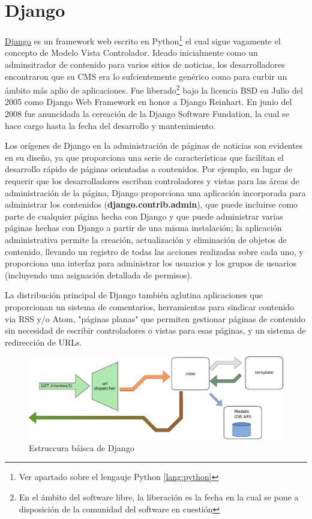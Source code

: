 \documentclass[a4paper]{report}
\begin{document}
\section{Django}
\href{http://www.djangoproject.com}{Django} es un framework web escrito en
Python\footnote{Ver apartado sobre el lengauje Python \ref{lang:python}}  el cual 
sigue vagamente el concepto de Modelo Vista
Controlador. Ideado inicialmente como un adminsitrador de contenido para varios sitios de noticias, 
los desarrolladores encontraron que su CMS era lo sufcientemente genérico como
para curbir un ámbito más aplio de aplicaciones. Fue liberado\footnote{En el
ámbito del software libre, la liberación es la fecha en la cual se pone a
disposición de la comunidad del software en cuestión} bajo la licencia BSD en
Julio del 2005 como Django Web Framework en honor a Django Reinhart. En junio del
2008 fue anuncidada la cereación de la Django Software Fundation, la cual se hace
cargo hasta la fecha del desarrollo y mantenimiento.

Los orígenes de Django en la administración de páginas de noticias son evidentes
en su diseño, ya que proporciona una serie de características que facilitan el
desarrollo rápido de páginas orientadas a contenidos. Por ejemplo, en lugar de
requerir que los desarrolladores escriban controladores y vistas para las áreas
de administración de la página, Django proporciona una aplicación incorporada
para administrar los contenidos (\textbf{django.contrib.admin}), 
que puede incluirse como parte de cualquier
página hecha con Django y que puede administrar varias páginas hechas con Django
a partir de una misma instalación; la aplicación administrativa permite la
creación, actualización y eliminación de objetos de contenido, llevando un
registro de todas las acciones realizadas sobre cada uno, y proporciona una
interfaz para administrar los usuarios y los grupos de usuarios (incluyendo una
asignación detallada de permisos).

La distribución principal de Django también aglutina aplicaciones que
proporcionan un sistema de comentarios, herramientas para sindicar contenido via
RSS y/o Atom, "páginas planas" que permiten gestionar páginas de contenido sin
necesidad de escribir controladores o vistas para esas páginas, y un sistema de
redirección de URLs.


\begin{figure}[htp]
\centering
\includegraphics[scale=0.60]{img/django_simple_mtv.pdf}
\caption{Estruccura báisca de Django}\label{fig:erptsqfit}
\end{figure}
  
\end{document}
